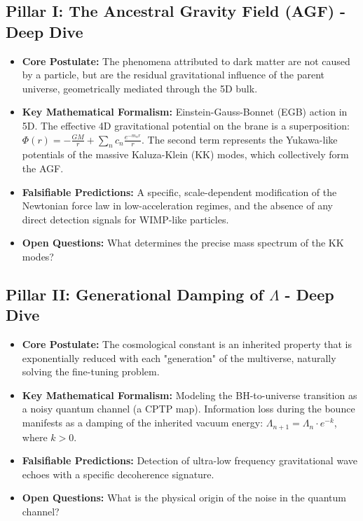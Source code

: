 \documentclass[aps,prd,onecolumn,10pt,superscriptaddress,nofootinbib,floatfix]{revtex4-2}
\begin{document}
\subsection{Pillar I: The Ancestral Gravity Field (AGF) - Deep Dive}
\begin{itemize}
    \item \textbf{Core Postulate:} The phenomena attributed to dark matter are not caused by a particle, but are the residual gravitational influence of the parent universe, geometrically mediated through the 5D bulk.
    \item \textbf{Key Mathematical Formalism:} Einstein-Gauss-Bonnet (EGB) action in 5D. The effective 4D gravitational potential on the brane is a superposition: $\Phi(r) = - \frac{GM}{r} + \sum_{n} c_n \frac{e^{-m_n r}}{r}$. The second term represents the Yukawa-like potentials of the massive Kaluza-Klein (KK) modes, which collectively form the AGF.
    \item \textbf{Falsifiable Predictions:} A specific, scale-dependent modification of the Newtonian force law in low-acceleration regimes, and the absence of any direct detection signals for WIMP-like particles.
    \item \textbf{Open Questions:} What determines the precise mass spectrum of the KK modes?
\end{itemize}

\subsection{Pillar II: Generational Damping of $\Lambda$ - Deep Dive}
\begin{itemize}
    \item \textbf{Core Postulate:} The cosmological constant is an inherited property that is exponentially reduced with each "generation" of the multiverse, naturally solving the fine-tuning problem.
    \item \textbf{Key Mathematical Formalism:} Modeling the BH-to-universe transition as a noisy quantum channel (a CPTP map). Information loss during the bounce manifests as a damping of the inherited vacuum energy: $\Lambda_{n+1} = \Lambda_n \cdot e^{-k}$, where $k > 0$.
    \item \textbf{Falsifiable Predictions:} Detection of ultra-low frequency gravitational wave echoes with a specific decoherence signature.
    \item \textbf{Open Questions:} What is the physical origin of the noise in the quantum channel?
\end{itemize}
\end{document}
